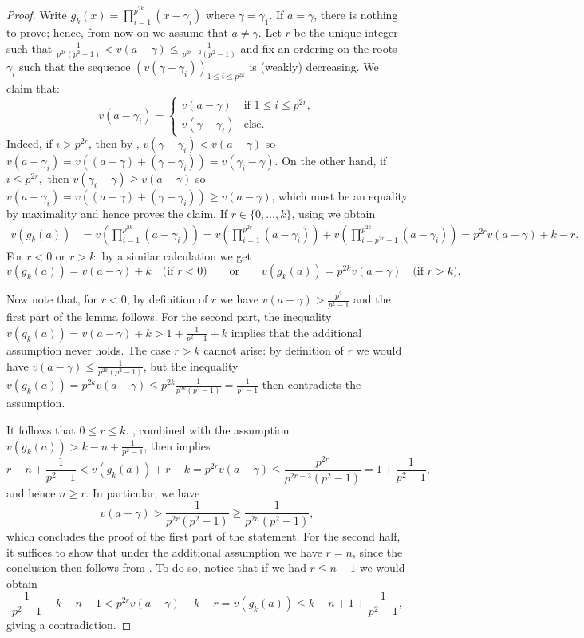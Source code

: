 \documentclass{amsart}
\theoremstyle{definition}
\numberwithin{theorem}{section}
\numberwithin{equation}{section}
\begin{document}
\begin{proof}
    Write $g_k(x) = \prod_{i=1}^{p^{2k}} (x-\gamma_i)$ where $\gamma=\gamma_1$. If $a=\gamma$, there is nothing to prove; hence, from now on we assume that $a \neq \gamma$.
    Let $r$ be the unique integer such that $\frac{1}{p^{2r}(p^2-1)} < v(a-\gamma) \le \frac{1}{p^{2r-2}(p^2-1)}$ and fix an ordering on the roots $\gamma_i$ such that the sequence $(v(\gamma-\gamma_i))_{1 \leq i \leq p^{2k}}$ is (weakly) decreasing. We claim that:
    \[
    v(a-\gamma_i)=\begin{cases}
        v(a-\gamma) & \text{if } 1 \leq i \leq p^{2r}, \\
        v(\gamma-\gamma_i) &\text{else}.
    \end{cases}
    \]
    Indeed, if $i>p^{2r}$, then by , $v(\gamma-\gamma_i)<v(a-\gamma)$ so $v(a-\gamma_i)= v((a-\gamma) + (\gamma-\gamma_i)) = v(\gamma_i-\gamma)$. On the other hand, if $i \leq p^{2r},$ then $v(\gamma_i - \gamma) \ge v(a-\gamma)$ so $v(a-\gamma_i) = v((a-\gamma) + (\gamma-\gamma_i)) \ge v(a-\gamma)$, which must be an equality by maximality and hence proves the claim.
    If $r \in \{0, \dots, k\}$, using  we obtain
    \begin{align}\label{eq: valuation of g(x)}
        v(g_k(a)) &= v\left( \prod_{i=1}^{p^{2k}} (a-\gamma_i) \right) = v\left( \prod\limits_{i=1}^{p^{2r}} (a-\gamma_i) \right) + v\left( \prod\limits_{i=p^{2r}+1}^{p^{2k}} (a-\gamma_i) \right) = p^{2r} v(a-\gamma) + k-r.
    \end{align}
    For $r<0$ or $r>k$, by a similar calculation we get
    \[
    v(g_k(a)) = v(a-\gamma)+k \quad \text{(if $r<0$)} \quad \quad \text{or} \quad \quad v(g_k(a)) = p^{2k}v(a-\gamma) \quad \text{(if $r>k$)}.
    \]
    
    Now note that, for $r<0$, by definition of $r$ we have $v(a-\gamma) > \frac{p^2}{p^2-1}$ and the first part of the lemma follows. For the second part, the inequality $v(g_k(a)) = v(a-\gamma) + k > 1 + \frac{1}{p^2-1} + k$ implies that the additional assumption never holds. The case $r>k$ cannot arise: by definition of $r$ we would have $v(a-\gamma) \leq \frac{1}{p^{2k}(p^2-1)}$, but the inequality $v(g_k(a)) = p^{2k}v(a-\gamma) \leq p^{2k} \frac{1}{p^{2k}(p^2-1)} = \frac{1}{p^2-1}$ then contradicts the assumption.
    
    It follows that $0 \leq r \leq k$. , combined with the assumption $v(g_k(a)) > k-n+\frac{1}{p^2-1}$, then implies
    \[
    r-n+\frac{1}{p^2-1} < v(g_k(a))+r-k = p^{2r}v(a-\gamma) \leq \frac{p^{2r}}{p^{2r-2}(p^2-1)} = 1+ \frac{1}{p^2-1},
    \]    
    \noindent and hence $n \ge r$. In particular, we have $$v(a-\gamma) > \frac{1}{p^{2r}(p^2-1)} \ge \frac{1}{p^{2n}(p^2-1)},$$
    which concludes the proof of the first part of the statement.
    For the second half, it suffices to show that under the additional assumption we have $r=n$, since the conclusion then follows from . To do so, notice that if we had $r \le n-1$ we would obtain
    \[
    \frac{1}{p^2-1} + k-n+1 <p^{2r}v(a-\gamma)+k-r = v(g_k(a)) \leq k-n+1 + \frac{1}{p^2-1},
    \]
    giving a contradiction.
\end{proof}
\end{document}
